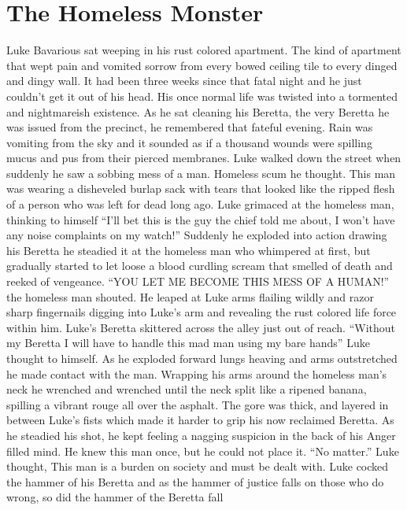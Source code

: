 \chapter{The Homeless Monster}





Luke Bavarious sat weeping in his rust colored apartment. The kind
of apartment that wept pain and vomited sorrow from every bowed
ceiling tile to every dinged and dingy wall. It had been three
weeks since that fatal night and he just couldn't get it out
of his head. His once normal life was twisted into a tormented and
nightmareish existence. As he sat cleaning his Beretta, the very
Beretta he was issued from the precinct, he remembered that fateful
evening. Rain was vomiting from the sky and it sounded as if a
thousand wounds were spilling mucus and pus from their pierced
membranes. Luke walked down the street when suddenly he saw a
sobbing mess of a man. Homeless scum he thought. This man was
wearing a disheveled burlap sack with tears that looked like the
ripped flesh of a person who was left for dead long ago. Luke
grimaced at the homeless man, thinking to himself ``I'll
bet this is the guy the chief told me about, I won't have any
noise complaints on my watch!'' Suddenly he exploded into
action drawing his Beretta he steadied it at the homeless man who
whimpered at first, but gradually started to let loose a blood
curdling scream that smelled of death and reeked of vengeance.
``YOU LET ME BECOME THIS MESS OF A HUMAN!'' the homeless
man shouted. He leaped at Luke arms flailing wildly and razor sharp
fingernails digging into Luke's arm and revealing the rust
colored life force within him. Luke's Beretta skittered
across the alley just out of reach. ``Without my Beretta I
will have to handle this mad man using my bare hands'' Luke
thought to himself. As he exploded forward lungs heaving and arms
outstretched he made contact with the man. Wrapping his arms around
the homeless man's neck he wrenched and wrenched until the
neck split like a ripened banana, spilling a vibrant rouge all over
the asphalt. The gore was thick, and layered in between
Luke's fists which made it harder to grip his now reclaimed
Beretta. As he steadied his shot, he kept feeling a nagging
suspicion in the back of his Anger filled mind. He knew this man
once, but he could not place it. ``No matter.'' Luke
thought, This man is a burden on society and must be dealt with.
Luke cocked the hammer of his Beretta and as the hammer of justice
falls on those who do wrong, so did the hammer of the Beretta fall
